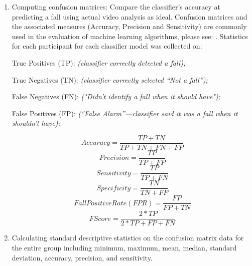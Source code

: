 \begin{enumerate}
    \item Computing confusion matrices: Compare the classifier’s accuracy at predicting a fall using actual video analysis as ideal. Confusion matrices and the associated measures (Accuracy, Precision and Sensitivity) are commonly used in the evaluation of machine learning algorithms, please see: \cite{Elkan12evaluatingclassifiers, Forman2010, Kohavi1998, lu2004, Hamilton2011}. Statistics for each participant for each classifier model was collected on:

    True Positives (TP): \textit{(classifier correctly detected a fall);}


    True Negatives (TN): \textit{(classifier correctly selected “Not a fall”);}


    False Negatives (FN): \textit{("Didn't identify a fall when it should have");}


    False Positives (FP): \textit{(“False Alarm”—classifier said it was a fall when it shouldn’t have);}


    \[Accuracy =\frac{TP + TN}{TP + TN + FN + FP}\]
    \[Precision =\frac{TP}{TP + FP}\]
    \[Sensitivity =\frac{TP}{TP + FN}\]
    \[Specificity =\frac{TN}{TN + FP}\]
    \[Fall  Positive  Rate (FPR) =\frac{FP}{FP + TN}\]
    \[FScore =\frac{2*TP}{2*TP + FP + FN}\]

    \item Calculating standard descriptive statistics on the confusion matrix data for the entire group including minimum, maximum, mean, median, standard deviation, accuracy, precision, and sensitivity.
\end{enumerate}


